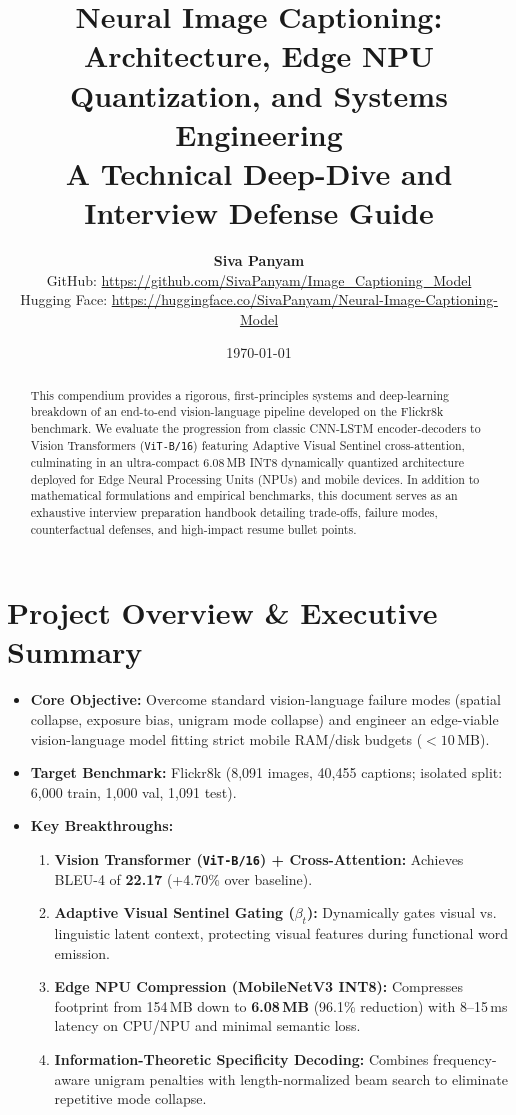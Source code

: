 \documentclass[11pt,a4paper]{article}
\title{\textbf{\LARGE Neural Image Captioning: Architecture, Edge NPU Quantization, and Systems Engineering}\\[0.5em]
\large A Technical Deep-Dive and Interview Defense Guide}
\author{\textbf{Siva Panyam} \\
GitHub: \url{https://github.com/SivaPanyam/Image_Captioning_Model} \\
Hugging Face: \url{https://huggingface.co/SivaPanyam/Neural-Image-Captioning-Model}}
\date{\today}
\begin{document}
\maketitle

\begin{abstract}
This compendium provides a rigorous, first-principles systems and deep-learning breakdown of an end-to-end vision-language pipeline developed on the Flickr8k benchmark. We evaluate the progression from classic CNN-LSTM encoder-decoders to Vision Transformers (\texttt{ViT-B/16}) featuring Adaptive Visual Sentinel cross-attention, culminating in an ultra-compact 6.08\,MB INT8 dynamically quantized architecture deployed for Edge Neural Processing Units (NPUs) and mobile devices. In addition to mathematical formulations and empirical benchmarks, this document serves as an exhaustive interview preparation handbook detailing trade-offs, failure modes, counterfactual defenses, and high-impact resume bullet points.
\end{abstract}

\tableofcontents
\newpage

\section{Project Overview \& Executive Summary}
\begin{itemize}[leftmargin=*]
    \item \textbf{Core Objective:} Overcome standard vision-language failure modes (spatial collapse, exposure bias, unigram mode collapse) and engineer an edge-viable vision-language model fitting strict mobile RAM/disk budgets ($< 10$\,MB).
    \item \textbf{Target Benchmark:} Flickr8k (8,091 images, 40,455 captions; isolated split: 6,000 train, 1,000 val, 1,091 test).
    \item \textbf{Key Breakthroughs:}
    \begin{enumerate}
        \item \textbf{Vision Transformer (\texttt{ViT-B/16}) + Cross-Attention:} Achieves BLEU-4 of \textbf{22.17} (+4.70\% over baseline).
        \item \textbf{Adaptive Visual Sentinel Gating ($\beta_t$):} Dynamically gates visual vs. linguistic latent context, protecting visual features during functional word emission.
        \item \textbf{Edge NPU Compression (MobileNetV3 INT8):} Compresses footprint from 154\,MB down to \textbf{6.08\,MB} (96.1\% reduction) with 8--15\,ms latency on CPU/NPU and minimal semantic loss.
        \item \textbf{Information-Theoretic Specificity Decoding:} Combines frequency-aware unigram penalties with length-normalized beam search to eliminate repetitive mode collapse.
    \end{enumerate}
\end{itemize}
\end{document}

